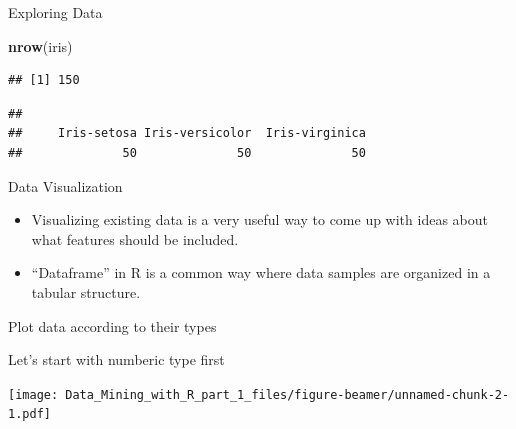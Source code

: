 \documentclass[ignorenonframetext,]{beamer}
\newenvironment{Shaded}{\begin{snugshade}}{\end{snugshade}}
\newcommand{\KeywordTok}[1]{\textcolor[rgb]{0.13,0.29,0.53}{\textbf{{#1}}}}
\newcommand{\DataTypeTok}[1]{\textcolor[rgb]{0.13,0.29,0.53}{{#1}}}
\newcommand{\DecValTok}[1]{\textcolor[rgb]{0.00,0.00,0.81}{{#1}}}
\newcommand{\CommentTok}[1]{\textcolor[rgb]{0.56,0.35,0.01}{\textit{{#1}}}}
\newcommand{\NormalTok}[1]{{#1}}
\providecommand{\tightlist}{%
\setlength{\itemsep}{0pt}\setlength{\parskip}{0pt}}
\begin{document}
\begin{frame}[fragile]{Exploring Data}

\begin{Shaded}
\begin{Highlighting}[]
\KeywordTok{nrow}\NormalTok{(iris)}
\end{Highlighting}
\end{Shaded}

\begin{verbatim}
## [1] 150
\end{verbatim}

\begin{Shaded}
\end{Shaded}

\begin{verbatim}
## 
##     Iris-setosa Iris-versicolor  Iris-virginica 
##              50              50              50
\end{verbatim}

\end{frame}

\begin{frame}{Data Visualization}

\begin{itemize}
\tightlist
\item
  Visualizing existing data is a very useful way to come up with ideas
  about what features should be included.
\item
  ``Dataframe'' in R is a common way where data samples are organized in
  a tabular structure.
\end{itemize}

\end{frame}

\begin{frame}[fragile]{Plot data according to their types}

Let's start with numberic type first

\begin{Shaded}
\end{Shaded}

\texttt{[image: Data\_Mining\_with\_R\_part\_1\_files/figure-beamer/unnamed-chunk-2-1.pdf]}

\end{frame}
\end{document}
